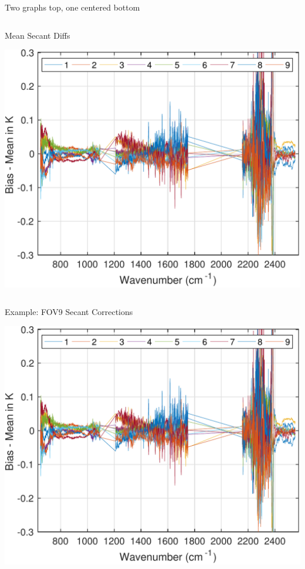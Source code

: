 \documentclass[10pt,t]{beamer}
\begin{document}
\begin{frame}[label={sec:org4279c0f}]{Two graphs top, one centered bottom}
\begin{columns}
    \begin{column}{0.5\columnwidth}
      \begin{block}{\footnotesize Mean Secant Diffs}
        \vspace{-0.05in}
        \vspace{-0.05in}
        \begin{center}
          \includegraphics[width=0.85\linewidth]{./testfig.pdf}
        \end{center}
      \end{block}
    \end{column}
  \end{columns}

  \vspace{-0.25in}
  \begin{columns}
    \begin{column}{0.5\columnwidth}
      \begin{block}{\footnotesize Example: FOV9 Secant Corrections}
        \vspace{-0.05in}
        \vspace{-0.05in}
        \begin{center}
          \includegraphics[width=0.85\linewidth]{./testfig.pdf}
        \end{center}
      \end{block}
    \end{column}
  \end{columns}
\end{frame}
\end{document}
